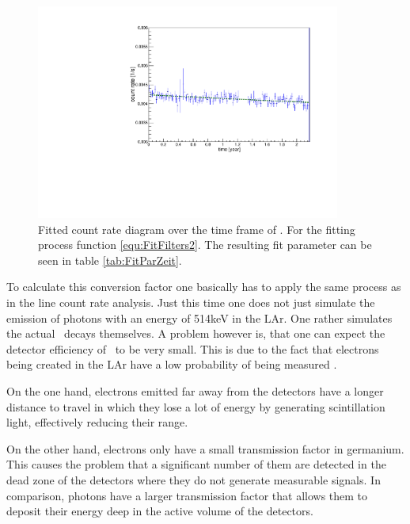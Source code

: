 \documentclass[encoding=utf8,british]{tumphthesis}
\begin{document}
\begin{figure}[t!]
	\centering
	\ifmakefigures%
	\includegraphics[width=100mm]{./Bilder/eventRateFit.pdf}
	\fi%
	\caption{
	    Fitted count rate diagram over the time frame of \PII.
	    For the fitting process function \ref{equ:FitFilters2}.
	    The resulting fit parameter can be seen in table \ref{tab:FitParZeit}.
	}
	\label{fig:ChangeInEventRateFit}
\end{figure}%


To calculate this conversion factor one basically has to apply the same process as in the line count rate analysis.
Just this time one does not just simulate the emission of photons with an energy of 514keV in the LAr.
One rather simulates the actual \Kr\ decays themselves.
A problem however is, that one can expect the detector efficiency of \Kr\ to be very small.
This is due to the fact that electrons being created in the LAr have a low probability of being measured .

On the one hand, electrons emitted far away from the detectors have a longer distance to travel in which they lose a lot of energy by generating scintillation light, effectively reducing their range.

On the other hand, electrons only have a small transmission factor in germanium.
This causes the problem that a significant number of them are detected in the dead zone of the detectors where they do not generate measurable signals.
In comparison, photons have a larger transmission factor that allows them to deposit their energy deep in the active volume of the detectors.
\end{document}
